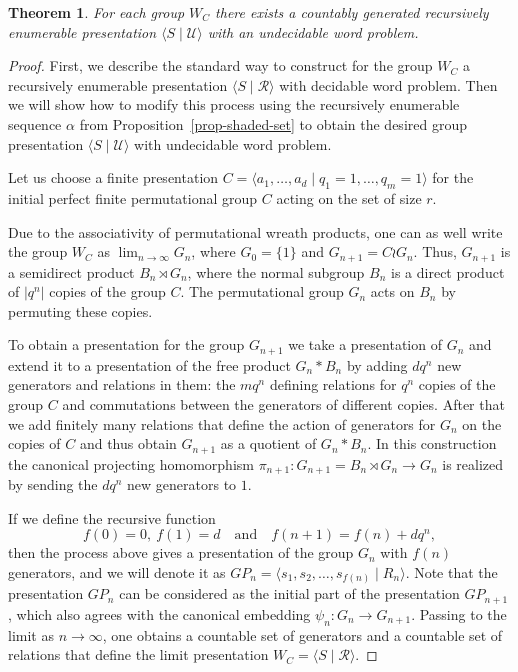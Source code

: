 \documentclass[12pt,a4paper]{amsart}
\newtheorem{theorem}{Theorem}
\begin{document}
\begin{theorem}
For each group $W_C$ there exists a countably generated recursively enumerable presentation $\langle S \mid \mathcal U \rangle$ with an undecidable word problem.
\label{th-undecidable}
\end{theorem}
\begin{proof}
First, we describe the standard way to construct for the group $W_C$ a recursively enumerable presentation $\langle S \mid \mathcal R \rangle$ with decidable word problem. Then we will show how to modify this process using the recursively enumerable sequence $\alpha$ from Proposition~\ref{prop-shaded-set} to obtain the desired group presentation $\langle S \mid \mathcal U \rangle$ with undecidable word problem.

\smallskip

Let us choose a finite presentation $C=\langle a_1,\ldots,a_d \mid q_1=1, \ldots,q_m=1 \rangle$ for the initial perfect finite permutational group $C$ acting on the set of size $r$. 

Due to the associativity of permutational wreath products, one can as well write the group $W_C$ as $\lim_{n\to \infty} G_n$, where $G_0=\{1\}$ and $G_{n+1}= C \wr G_{n}$. Thus, $G_{n+1}$ is a semidirect product $B_n \rtimes G_n$, where the normal subgroup $B_n$ is a direct product of $|q^n|$ copies of the group $C$. The permutational group $G_n$ acts on $B_n$ by permuting these copies. 

To obtain a presentation for the group $G_{n+1}$ we take a presentation of $G_n$ and extend it to a presentation of the free product $G_{n}*B_n$ by adding $dq^n$ new generators and relations in them: the $mq^n$ defining relations for $q^n$ copies of the group $C$ and commutations between the generators of different copies. After that we add finitely many relations that define the action of generators for $G_n$ on the copies of $C$ and thus obtain $G_{n+1}$ as a quotient of $G_{n}*B_n$. In this construction the canonical projecting homomorphism $\pi_{n+1}: G_{n+1}=B_n \rtimes G_n \to G_n$ is realized by sending the $dq^n$ new generators to $1$. 

If we define the recursive function
\begin{equation}
f(0)=0, \ f(1)=d \quad \text{and} \quad  f(n+1)=f(n)+dq^n,
\end{equation}
then the process above gives a presentation of the group $G_n$ with $f(n)$ generators, and we will denote it as $GP_n=\langle s_1,s_2,\ldots,s_{f(n)} \mid R_n \rangle$. Note that the presentation $GP_n$ can be considered as the initial part of the presentation $GP_{n+1}$, which also agrees with the canonical embedding $\psi_n:G_n\to G_{n+1}$. Passing to the limit as $n\to\infty$, one obtains a countable set of generators and a countable set of relations that define the limit presentation $W_C=\langle S \mid \mathcal R \rangle$.



\end{proof}
\end{document}
